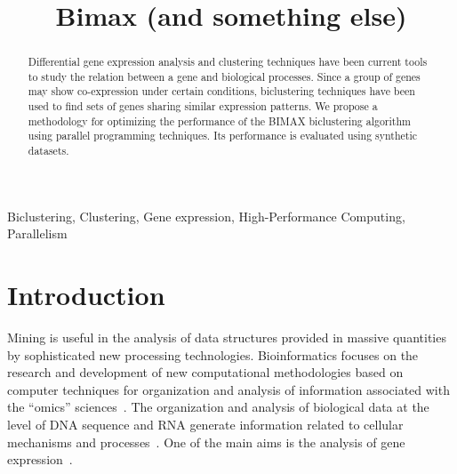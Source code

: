 \documentclass[a4paper,conference]{IEEEtran}
\renewcommand{\abstractname}{Abstract}
\begin{document}
\title{Bimax (and something else)}
\author{
\and
{} 
}

\maketitle

\renewcommand{\abstractname}{Abstract}
\begin{abstract}
Differential gene expression analysis and clustering techniques have been current tools to study the relation between a gene and biological processes. Since a group of genes may show co-expression under certain conditions, biclustering techniques have been used to find sets of genes sharing similar expression patterns. We propose a methodology for optimizing the performance of the BIMAX biclustering algorithm using parallel programming techniques. Its performance is evaluated using synthetic datasets. 
\end{abstract}

\begin{IEEEkeywords}
Biclustering, Clustering, Gene expression, High-Performance Computing, Parallelism
\end{IEEEkeywords}
\IEEEpeerreviewmaketitle

\section{Introduction}
 Mining is useful in the analysis of data structures provided in massive quantities by sophisticated new processing technologies. Bioinformatics focuses on the research and development of new computational methodologies based on computer techniques for organization and analysis of information associated with the  ``omics'' sciences~\cite{luscombe2001bioinformatics}. The organization and analysis of biological data at the level of DNA sequence and RNA generate information related to cellular mechanisms and processes~\cite{mount2004sequence}. One of the main aims is the analysis of gene expression~\cite{griffiths2003genetica}.
\end{document}
